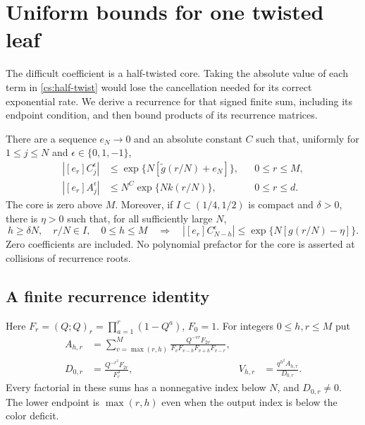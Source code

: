\section{Uniform bounds for one twisted leaf}\label{cs:local}

The difficult coefficient is a half-twisted core. Taking the absolute value of each term in \eqref{cs:half-twist} would lose the cancellation needed for its correct exponential rate. We derive a recurrence for that signed finite sum, including its endpoint condition, and then bound products of its recurrence matrices.

\begin{proposition}\label{cs:envelopes}
There are a sequence $e_N\to0$ and an absolute constant $C$ such that, uniformly for $1\le j\le N$ and $\epsilon\in\{0,1,-1\}$,
\begin{align}
 |[e_r]C_j^\epsilon|&\le
 \exp\{N[\widetilde g(r/N)+e_N]\},&&0\le r\le M,\label{cs:core-envelope}\\
 |[e_r]A_j^\epsilon|&\le N^C\exp\{Nk(r/N)\},&&0\le r\le d.\label{cs:alias-envelope}
\end{align}
The core is zero above $M$. Moreover, if $I\subset(1/4,1/2)$ is compact and $\delta>0$, there is $\eta>0$ such that, for all sufficiently large $N$,
\begin{equation}\label{cs:local-color-loss}
 h\ge\delta N,\quad r/N\in I,\quad 0\le h\le M
 \quad\Longrightarrow\quad
 |[e_r]C_{N-h}^\epsilon|
 \le\exp\{N[g(r/N)-\eta]\}.
\end{equation}
Zero coefficients are included. No polynomial prefactor for the core is asserted at collisions of recurrence roots.
\end{proposition}

\subsection{A finite recurrence identity}
Here $F_r=(Q;Q)_r=\prod_{a=1}^r(1-Q^a)$, $F_0=1$. For integers $0\le h,r\le M$ put
\begin{align}
 A_{h,r}&=\sum_{v=\max(r,h)}^M
 \frac{Q^{-vr}F_{2v}}{F_vF_{v-h}F_{v+h}F_{v-r}},\label{cs:finite-A}\\
 D_{0,r}&=\frac{Q^{-r^2}F_{2r}}{F_r^3},
 &V_{h,r}&=\frac{q^{h^2}A_{h,r}}{D_{0,r}}.\label{cs:finite-V}
\end{align}
Every factorial in these sums has a nonnegative index below $N$, and $D_{0,r}\ne0$. The lower endpoint is $\max(r,h)$ even when the output index is below the color deficit.

